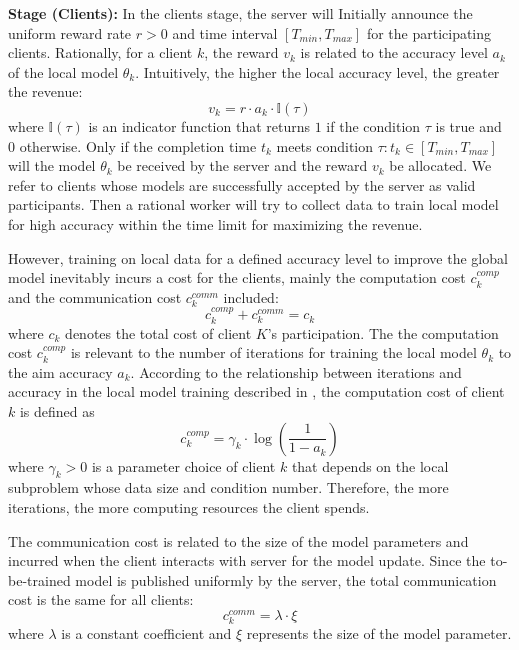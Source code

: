 \documentclass[final,1p,times]{elsarticle}
\begin{document}
\textbf{Stage \uppercase\expandafter{} (Clients):} In the clients stage, the server will Initially announce the uniform reward rate $r>0$ and time interval $[T_{min},T_{max}]$ for the participating clients. Rationally, for a client $k$, the reward $v_k$ is related to the accuracy level $a_k$ of the local model $\theta_k$. Intuitively, the higher the local accuracy level, the greater the revenue:
\begin{equation}
	v_k = r\cdot a_k\cdot \mathbb{I}(\tau)
\end{equation}
where $\mathbb{I}(\tau)$ is an indicator function that returns $1$ if the condition $\tau$ is true and $0$ otherwise. Only if the completion time $t_k$ meets condition $\tau: t_k\in[T_{min},T_{max}]$ will the model $\theta_k$ be received by the server and the reward $v_k$ be allocated. We refer to clients whose models are successfully accepted by the server as valid participants. Then a rational worker will try to collect data to train local model for high accuracy within the time limit for maximizing the revenue. 

However, training on local data for a defined accuracy level to improve the global model inevitably incurs a cost for the clients, mainly the computation cost $c_k^{comp}$ and the communication cost $c_k^{comm}$ included:
\begin{equation}
	c_k^{comp} + c_k^{comm} = c_k
\end{equation}
where $c_k$ denotes the total cost of client $K$'s participation. The the computation cost $c_k^{comp}$ is relevant to the number of iterations for training the local model $\theta_k$ to the aim accuracy $a_k$. According to the relationship between iterations and accuracy in the local model training described in \citep{pandey2020crowdsourcing}, the computation cost of client $k$ is defined as
\begin{equation}
	c_k^{comp} = \gamma_k\cdot \log(\frac{1}{1-a_k})
\end{equation}
where $\gamma_k>0$ is a parameter choice of client $k$ that depends on the local subproblem whose data size and condition number. Therefore, the more iterations, the more computing resources the client spends.

The communication cost is related to the size of the model parameters and incurred when the client interacts with server for the model update. Since the to-be-trained model is published uniformly by the server, the total communication cost is the same for all clients:
\begin{equation}
	c_k^{comm} = \lambda\cdot\xi
\end{equation}
where $\lambda$ is a constant coefficient and $\xi$ represents the size of the model parameter.
\end{document}
